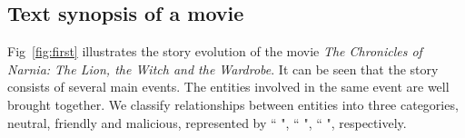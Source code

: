 \documentclass[review,journal]{vgtc}         %
\begin{document}
\subsection{Text synopsis of a movie}
Fig~\ref{fig:first} illustrates the story evolution of the movie \textit{The Chronicles of Narnia: The Lion, the Witch and the Wardrobe}. It can be seen that the story consists of several main events. The entities involved in the same event are well brought together. We classify relationships between entities into three categories, neutral, friendly and malicious, represented by `` ", ``  ", ``  ", respectively. 
\end{document}
